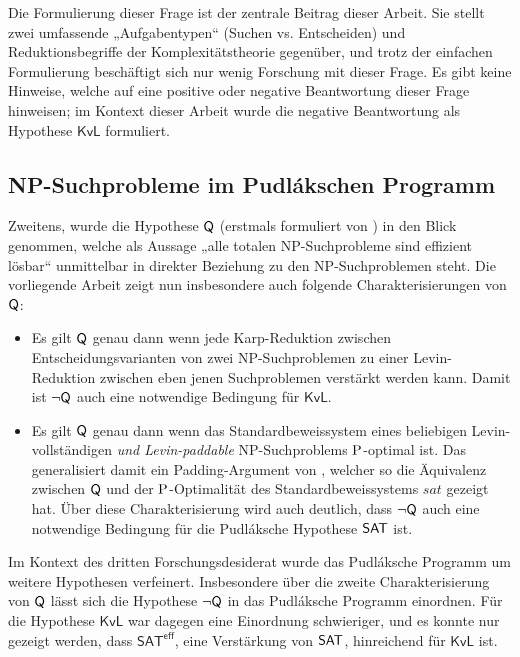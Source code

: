 Die Formulierung dieser Frage ist der zentrale Beitrag dieser Arbeit.
Sie stellt zwei umfassende „Aufgabentypen“ (Suchen vs. Entscheiden) und Reduktionsbegriffe der Komplexitätstheorie gegenüber, und trotz der einfachen Formulierung beschäftigt sich nur wenig Forschung mit dieser Frage.
Es gibt keine Hinweise, welche auf eine positive oder negative Beantwortung dieser Frage hinweisen; im Kontext dieser Arbeit wurde die negative Beantwortung als Hypothese $\mathsf{KvL}$ formuliert.



\subsection*{NP-Suchprobleme im Pudlákschen Programm}

Zweitens, wurde die Hypothese $\hQ$ (erstmals formuliert von \cite{fenner_inverting_1996}) in den Blick genommen, welche als Aussage „alle totalen NP-Suchprobleme sind effizient lösbar“ unmittelbar in direkter Beziehung zu den NP-Suchproblemen steht.
Die vorliegende Arbeit zeigt nun insbesondere auch folgende Charakterisierungen von $\hQ$:
\begin{itemize}[midpenalty=0]
    \item Es gilt $\hQ$ genau dann wenn jede Karp-Reduktion zwischen Entscheidungsvarianten von zwei NP-Suchproblemen zu einer Levin-Reduktion zwischen eben jenen Suchproblemen verstärkt werden kann. Damit ist $\neg\hQ$ auch eine notwendige Bedingung für $\mathsf{KvL}$.
    \item Es gilt $\hQ$ genau dann wenn das Standardbeweissystem eines beliebigen Levin-vollständigen \emph{und Levin-paddable} NP-Suchproblems $\P$-optimal ist. Das generalisiert damit ein Padding-Argument von \textcite{messner_simulation_2001}, welcher so die Äquivalenz zwischen $\hQ$ und der $\P$-Optimalität des Standardbeweissystems $\mathit{sat}$ gezeigt hat. Über diese Charakterisierung wird auch deutlich, dass $\neg\hQ$ auch eine notwendige Bedingung für die Pudláksche Hypothese $\hSAT$ ist.
\end{itemize}
Im Kontext des dritten Forschungsdesiderat wurde das Pudláksche Programm um weitere Hypothesen verfeinert. Insbesondere über die zweite Charakterisierung von $\hQ$ lässt sich die Hypothese $\neg\hQ$ in das Pudláksche Programm einordnen. Für die Hypothese $\mathsf{KvL}$ war dagegen eine Einordnung schwieriger, und es konnte nur gezeigt werden, dass $\mathsf{SAT^{eff}}$, eine Verstärkung von $\hSAT$, hinreichend für $\mathsf{KvL}$ ist.

